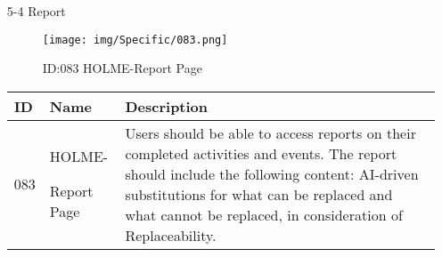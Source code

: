 \documentclass[conference]{IEEEtran}
\begin{document}
\begin{enumerate}
\vspace{1cm}
\item[5-4] Report \\
\begin{figure}[h]
\centering                                         
\texttt{[image: img/Specific/083.png]}
\caption{ID:083 HOLME-Report Page}
\end{figure}
\begin{table}[h]
\def\arraystretch{1.2} \small
    \begin{tabular}{|p{1cm}|p{1.8cm}|p{5.0cm}|}
        \hline
        ID & Name & Description\\ \hline
         083 \par  & HOLME-\par Report Page & 
         Users should be able to access reports on their completed activities and events. The report should include the following content: AI-driven substitutions for what can be replaced and what cannot be replaced, in consideration of Replaceability.




         \\ \hline
    \end{tabular}
\end{table}
\clearpage



\end{enumerate}
\end{document}
